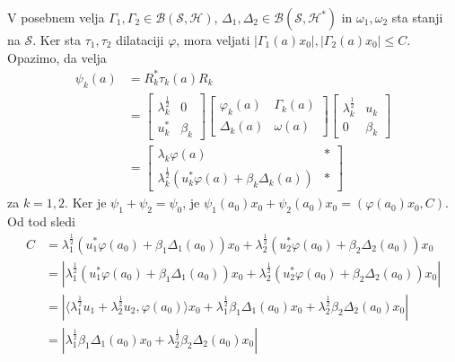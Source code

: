 \begin{dokaz}
    V posebnem velja $\Gamma_1, \Gamma_2 \in \mathcal{B}(\mathcal{S}, \mathcal{H})$,
    $\Delta_1, \Delta_2 \in \mathcal{B}(\mathcal{S}, \mathcal{H}^*)$ in $\omega_1, \omega_2$ sta stanji na $\mathcal{S}$.
    Ker sta $\tau_1, \tau_2$ dilataciji $\varphi$, mora veljati $|\Gamma_1 (a) x_0|, |\Gamma_2 (a) x_0| \leq C$.
    Opazimo, da velja 
    \begin{align*}
        \psi_k (a) &= R_k ^* \tau_k (a) R_k\\ 
        &= \begin{bmatrix}
            \lambda_k ^{\frac{1}{2}} & 0\\
            u_k ^* & \beta_k
        \end{bmatrix} 
        \begin{bmatrix}
            \varphi_k (a) & \Gamma_k (a)\\
            \Delta_k (a) & \omega (a)
        \end{bmatrix}
        \begin{bmatrix}
            \lambda_k ^{\frac{1}{2}} & u_k\\
            0 & \beta_k
        \end{bmatrix}\\
        &= \begin{bmatrix}
            \lambda_k \varphi (a) & *\\
            \lambda_k ^{\frac{1}{2}} (u_k^* \varphi(a) + \beta_k \Delta_k (a)) & *
        \end{bmatrix}
    \end{align*}
    za $k = 1, 2$.
    Ker je $\psi_1 + \psi_2 = \psi_0$, je $\psi_1 (a_0) x_0 + \psi_2 (a_0) x_0 = (\varphi(a_0)x_0, C)$.
    Od tod sledi 
    \begin{align}
        C &= \lambda_1 ^{\frac{1}{2}} (u_1^* \varphi(a_0) + \beta_1 \Delta_1 (a_0))x_0 + \lambda_2 ^{\frac{1}{2}} (u_2^* \varphi(a_0) + \beta_2 \Delta_2 (a_0)) x_0 \nonumber\\
        &= \left| \lambda_1 ^{\frac{1}{2}} (u_1^* \varphi(a_0) + \beta_1 \Delta_1 (a_0)) x_0 + \lambda_2 ^{\frac{1}{2}} (u_2^* \varphi(a_0) + \beta_2 \Delta_2 (a_0)) x_0 \right| \nonumber\\
        &= \left| \langle \lambda_1 ^{\frac{1}{2}} u_1 + \lambda_2 ^{\frac{1}{2}} u_2, \varphi(a_0) \rangle x_0 + \lambda_1 ^{\frac{1}{2}}\beta_1 \Delta_1 (a_0) x_0 + \lambda_2 ^{\frac{1}{2}}\beta_2 \Delta_2 (a_0) x_0 \right| \nonumber\\
        &= \left| \lambda_1 ^{\frac{1}{2}}\beta_1 \Delta_1 (a_0) x_0 + \lambda_2 ^{\frac{1}{2}}\beta_2 \Delta_2 (a_0) x_0 \right| \nonumber\\

\end{align}
\end{dokaz}
